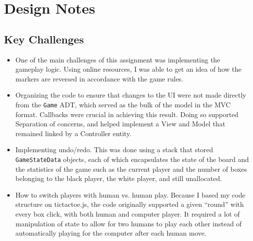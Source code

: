 \documentclass[11pt,letterpaper]{article}
\begin{document}
\section{Design Notes}
\subsection{Key Challenges}
\begin{itemize}
\item One of the main challenges of this assignment was implementing the gameplay logic. Using online resources, I was able to get an idea of how the markers are reversed in accordance with the game rules.
\item Organizing the code to ensure that changes to the UI were not made directly from the \texttt{Game} ADT, which served as the bulk of the model in the MVC format. Callbacks were crucial in achieving this result. Doing so supported Separation of concerns, and helped implement a View and Model that remained linked by a Controller entity.
\item Implementing undo/redo. This was done using a stack that stored \texttt{GameStateData} objects, each of which encapsulates the state of the board and the statistics of the game such as the current player and the number of boxes belonging to the black player, the white player, and still unallocated. 
\item How to switch players with human vs. human play. Because I based my code structure on tictactoe.js, the code originally supported a given ``round'' with every box click, with both human and computer player. It required a lot of manipulation of state to allow for two humans to play each other instead of automatically playing for the computer after each human move.
\end{itemize}
\end{document}

